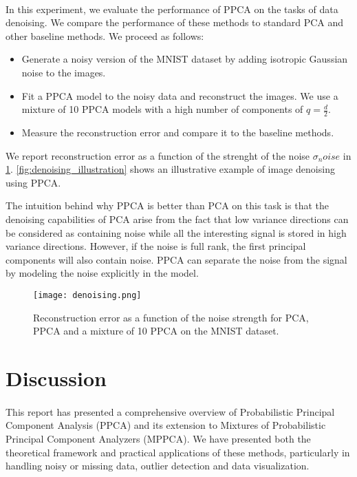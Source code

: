 \documentclass{article}
\begin{document}
\paragraph{} In this experiment, we evaluate the performance of PPCA on the tasks of data denoising. We compare the performance of these methods to standard PCA and other baseline methods. We proceed as follows:

\begin{itemize}
    \item Generate a noisy version of the MNIST dataset by adding isotropic Gaussian noise to the images.
    \item Fit a PPCA model to the noisy data and reconstruct the images. We use a mixture of 10 PPCA models with a high number of components of $q = \frac{d}{2}$.
    \item Measure the reconstruction error and compare it to the baseline methods.
\end{itemize}

We report reconstruction error as a function of the strenght of the noise $\sigma_noise$ in \cref{fig:denoising}. \cref{fig:denoising_illustration} shows an illustrative example of image denoising using PPCA.

The intuition behind why PPCA is better than PCA on this task is that the denoising capabilities of PCA arise from the fact that low variance directions can be considered as containing noise while all the interesting signal is stored in high variance directions. However, if the noise is full rank, the first principal components will also contain noise. PPCA can separate the noise from the signal by modeling the noise explicitly in the model.

\begin{figure}[H]
    \centering
    \texttt{[image: denoising.png]}
    \caption{Reconstruction error as a function of the noise strength for PCA, PPCA and a mixture of 10 PPCA on the MNIST dataset.}
    \label{fig:denoising}
\end{figure}

\section{Discussion}
\label{sec:discussion}

\paragraph{} This report has presented a comprehensive overview of Probabilistic Principal Component Analysis (PPCA) and its extension to Mixtures of Probabilistic Principal Component Analyzers (MPPCA). We have presented both the theoretical framework and practical applications of these methods, particularly in handling noisy or missing data, outlier detection and data visualization.
\end{document}
